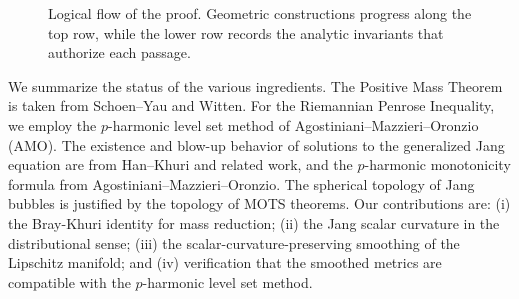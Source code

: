 \begin{figure}[t]
    \centering
    \caption{Logical flow of the proof. Geometric constructions progress along the top row, while the lower row records the analytic invariants that authorize each passage.}
    \label{fig:proof-architecture}
\end{figure}

\medskip
%
We summarize the status of the various ingredients. The Positive Mass Theorem is taken from Schoen--Yau and Witten. For the Riemannian Penrose Inequality, we employ the $p$-harmonic level set method of Agostiniani--Mazzieri--Oronzio (AMO). The existence and blow-up behavior of solutions to the generalized Jang equation are from Han--Khuri and related work, and the $p$-harmonic monotonicity formula from Agostiniani--Mazzieri--Oronzio. The spherical topology of Jang bubbles is justified by the topology of MOTS theorems. Our contributions are: (i) the Bray-Khuri identity for mass reduction; (ii) the Jang scalar curvature in the distributional sense; (iii) the scalar-curvature-preserving smoothing of the Lipschitz manifold; and (iv) verification that the smoothed metrics are compatible with the $p$-harmonic level set method.

